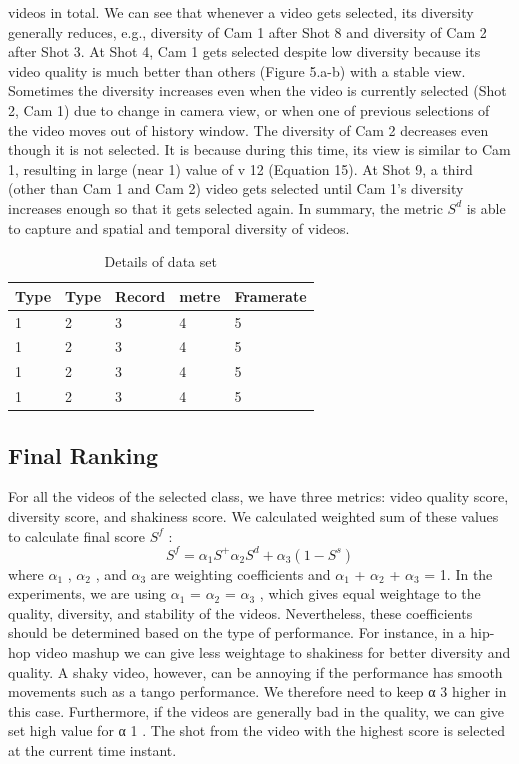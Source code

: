 \documentclass{sig-alternate-05-2015}
\begin{document}
videos in total. We can see that whenever a video gets selected,
its diversity generally reduces, e.g., diversity of Cam 1 after Shot 8
and diversity of Cam 2 after Shot 3. At Shot 4, Cam 1 gets selected
despite low diversity because its video quality is much better than
others (Figure 5.a-b) with a stable view. Sometimes the diversity
increases even when the video is currently selected (Shot 2, Cam 1)
due to change in camera view, or when one of previous selections
of the video moves out of history window. The diversity of Cam 2
decreases even though it is not selected. It is because during this
time, its view is similar to Cam 1, resulting in large (near 1) value
of v 12 (Equation 15). At Shot 9, a third (other than Cam 1 and Cam
2) video gets selected until Cam 1$’$s diversity increases enough so
that it gets selected again. In summary, the metric $S^d$ is able to
capture and spatial and temporal diversity of videos.

\begin{table}
\centering
\caption{ Details of data set }
\begin{tabular}{p{1.2cm}|p{1.2cm}|p{1.2cm}|p{1.2cm}|l} \hline
Type&Type&Record&metre&Framerate\\ \hline
1&2&3&4&5\\ \hline
1&2&3&4&5\\ \hline
1&2&3&4&5\\ \hline
1&2&3&4&5\\ \hline
\end{tabular}
\end{table}

\subsection{Final Ranking}
For all the videos of the selected class, we have three metrics:
video quality score, diversity score, and shakiness score. We calculated weighted sum of these values to calculate final score $S^f$ :
\begin{equation}
    S^f = \alpha_1S^+\alpha_2S^d+\alpha_3(1-S^s)
\end{equation}
where $\alpha_1$ , $\alpha_2$ , and $\alpha_3$ are weighting coefficients and $\alpha_1$ + $\alpha_2$ + $\alpha_3$ = 1. In the experiments, we are using $\alpha_1$ = $\alpha_2$ = $\alpha_3$ , which gives equal weightage to the quality, diversity, and stability of the videos. Nevertheless, these coefficients should be determined based on the type of performance. For instance, in a hip-hop
video mashup we can give less weightage to shakiness for better diversity and quality. A shaky video, however, can be annoying if the
performance has smooth movements such as a tango performance.
We therefore need to keep α 3 higher in this case. Furthermore, if
the videos are generally bad in the quality, we can give set high
value for α 1 . The shot from the video with the highest score is
selected at the current time instant.
\end{document}
